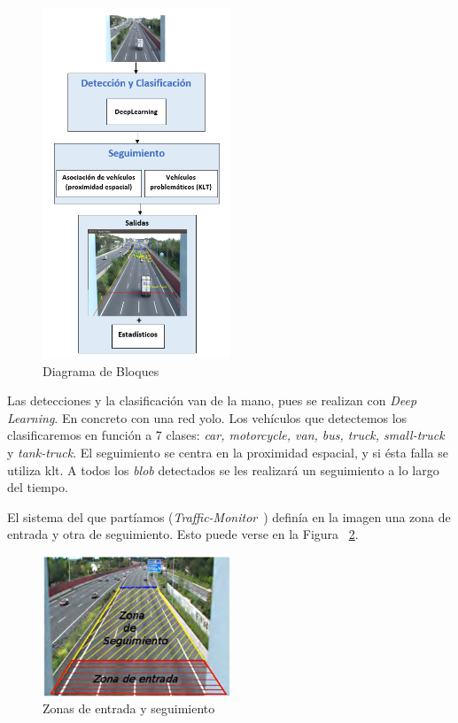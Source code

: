 \begin{figure}
\begin{center}
	\includegraphics[width=0.5\textwidth]{figures/Diseno_global/diagrama_bloques.PNG}
   \caption{Diagrama de Bloques}
	\label{fig.diagrama_bloques}
\end{center}
\end{figure}

Las detecciones y la clasificación van de la mano, pues se realizan con \textit{Deep Learning}. En concreto con una red \acrshort{yolo}. Los vehículos que detectemos los clasificaremos en función a 7 clases:  \textit{car, motorcycle, van, bus, truck, small-truck} y \textit{tank-truck}. El seguimiento se centra en la proximidad espacial, y si ésta falla se utiliza \acrshort{klt}. A todos los \textit{blob} detectados se les realizará un seguimiento a lo largo del tiempo. 

El sistema del que partíamos (\textit{Traffic-Monitor}~\cite{traffic_monitor_redo}) definía en la imagen una zona de entrada y otra de seguimiento. Esto puede verse en la Figura ~\ref{fig.zonas}.

\begin{figure}[H] 
\begin{center}
	\includegraphics[width=0.5\textwidth]{figures/Diseno_global/zonas.jpg}
   \caption{Zonas de entrada y seguimiento}
	\label{fig.zonas}
\end{center}
\end{figure}

